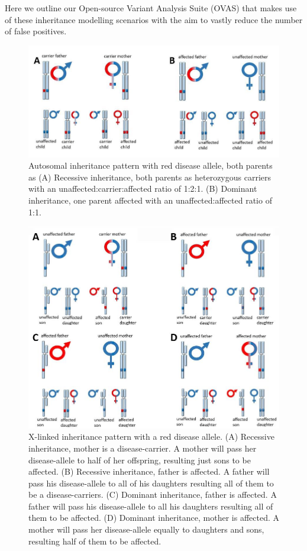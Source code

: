 \documentclass{bioinfo}
\def\app{OVAS}
\begin{document}
Here we outline our Open-source Variant Analysis Suite (\app{}) that makes use of these inheritance modelling scenarios with the aim to vastly reduce the number of false positives.

\begin{figure}[!tpb]
  \centerline{\includegraphics[width=\columnwidth]{inh_autosomal.jpg}}\caption{Autosomal inheritance pattern with red disease allele, both parents as 
(A) Recessive inheritance, both parents as heterozygous carriers with an unaffected:carrier:affected ratio of 1:2:1.
(B) Dominant inheritance, one parent affected with an unaffected:affected ratio of 1:1.}\label{fig:inheritance}
\end{figure}

\begin{figure}[!tpb]
  \centerline{\includegraphics[width=\columnwidth]{inh_xlinked.jpg}}\caption{X-linked inheritance pattern with a red disease allele. (A) Recessive inheritance, mother is a disease-carrier. A mother will pass her disease-allele to half of her offspring, resulting just sons to be affected. (B) Recessive inheritance, father is affected. A father will pass his disease-allele to all of his daughters resulting all of them to be a disease-carriers. (C) Dominant inheritance, father is affected. A father will pass his disease-allele to all his daughters resulting all of them to be affected. (D) Dominant inheritance, mother is affected. A mother will pass her disease-allele equally to daughters and sons, resulting half of them to be affected.}\label{fig:inheritancex}
\end{figure}
\end{document}

